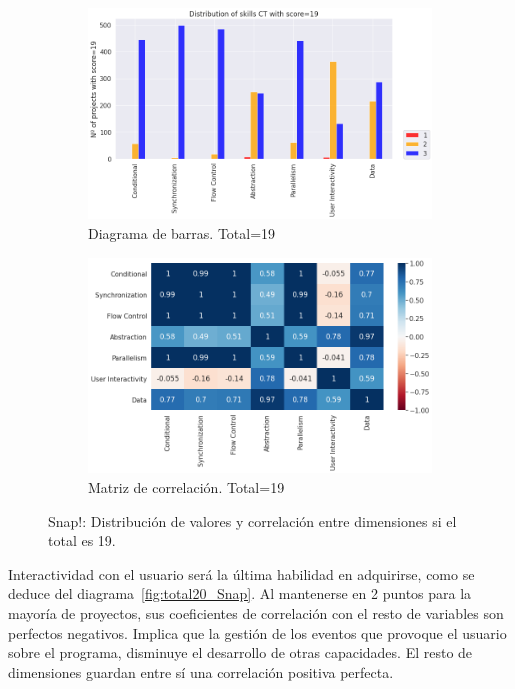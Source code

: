 \documentclass[a4paper, 12pt]{book}
\begin{document}
\begin{figure}[H]
    \centering
    \begin{subfigure}[h]{.49\textwidth} 
        \includegraphics[width=\textwidth]{img/distribucion_19_Snap}
        \caption{Diagrama de barras. Total=19}
        \label{fig:total19_Snap}
    \end{subfigure}       
    \begin{subfigure}[h]{.49\textwidth} 
        \includegraphics[width=\textwidth]{img/corr_19_Snap}
        \caption{Matriz de correlación. Total=19}
        \label{fig:corr19_Snap}
    \end{subfigure}
    \caption{Snap!: Distribución de valores y correlación entre dimensiones si el total es 19.}
\end{figure}

Interactividad con el usuario será la última habilidad en adquirirse, como se deduce del diagrama~\ref{fig:total20_Snap}. Al mantenerse en 2 puntos para la mayoría de proyectos, sus coeficientes de correlación con el resto de variables son perfectos negativos. Implica que la gestión de los eventos que provoque el usuario sobre el programa, disminuye el desarrollo de otras capacidades. El resto de dimensiones guardan entre sí una correlación positiva perfecta.
\end{document}
